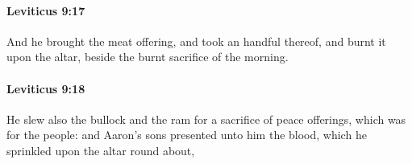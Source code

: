 		\paragraph{Leviticus 9:17} %
			\label{LEVITICUS-9-17}

			And he brought the meat offering, and took an handful thereof, and burnt it upon the altar, beside the burnt sacrifice of the morning.


		\paragraph{Leviticus 9:18} %
			\label{LEVITICUS-9-18}

			He slew also the bullock and the ram for a sacrifice of peace offerings, which was for the people: and Aaron’s sons presented unto him the blood, which he sprinkled upon the altar round about,



